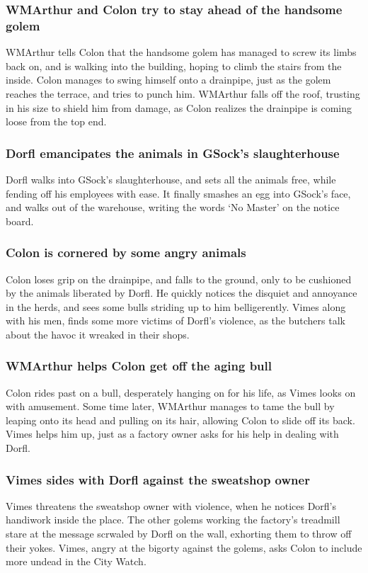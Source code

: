 \subsubsection{\Gls{WMArthur} and \Gls{Colon} try to stay ahead of the handsome golem}
\Gls{WMArthur} tells \Gls{Colon} that the handsome golem has managed to screw its limbs back on, and
is walking into the building, hoping to climb the stairs from the inside. \Gls{Colon} manages to
swing himself onto a drainpipe, just as the golem reaches the terrace, and tries to punch him.
\Gls{WMArthur} falls off the roof, trusting in his size to shield him from damage, as \Gls{Colon}
realizes the drainpipe is coming loose from the top end.

\subsubsection{\Gls{Dorfl} emancipates the animals in \Gls{GSock}'s slaughterhouse}
\Gls{Dorfl} walks into \Gls{GSock}'s slaughterhouse, and sets all the animals free, while fending
off his employees with ease. It finally smashes an egg into \Gls{GSock}'s face, and walks out of the
warehouse, writing the words `No Master' on the notice board.

\subsubsection{\Gls{Colon} is cornered by some angry animals}
\Gls{Colon} loses grip on the drainpipe, and falls to the ground, only to be cushioned by the
animals liberated by \Gls{Dorfl}. He quickly notices the disquiet and annoyance in the herds, and
sees some bulls striding up to him belligerently. \Gls{Vimes} along with his men, finds some more
victims of \Gls{Dorfl}'s violence, as the butchers talk about the havoc it wreaked in their shops.

\subsubsection{\Gls{WMArthur} helps \Gls{Colon} get off the aging bull}
\Gls{Colon} rides past on a bull, desperately hanging on for his life, as \Gls{Vimes} looks on with
amusement. Some time later, \Gls{WMArthur} manages to tame the bull by leaping onto its head and
pulling on its hair, allowing \Gls{Colon} to slide off its back. \Gls{Vimes} helps him up, just as
a factory owner asks for his help in dealing with \Gls{Dorfl}.

\subsubsection{\Gls{Vimes} sides with \Gls{Dorfl} against the sweatshop owner}
\Gls{Vimes} threatens the sweatshop owner with violence, when he notices \Gls{Dorfl}'s handiwork
inside the place. The other golems working the factory's treadmill stare at the message scrwaled
by \Gls{Dorfl} on the wall, exhorting them to throw off their yokes. \Gls{Vimes}, angry at the
bigorty against the golems, asks \Gls{Colon} to include more undead in the City Watch.

